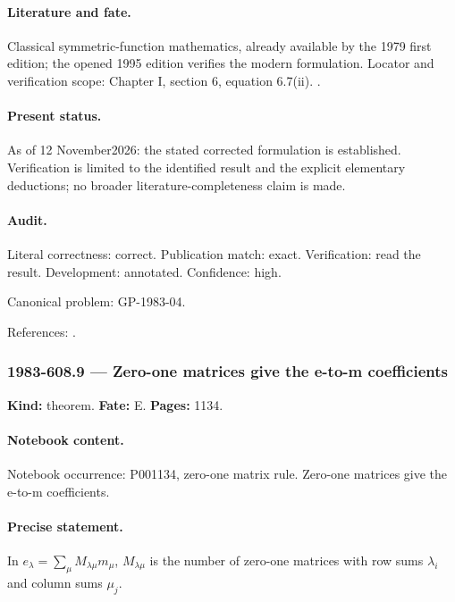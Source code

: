 \paragraph{Literature and fate.} Classical symmetric-function mathematics, already available by the 1979 first edition; the opened 1995 edition verifies the modern formulation. Locator and verification scope: Chapter I, section 6, equation 6.7(ii). \cite{macdonald1995symmetric}.

\paragraph{Present status.} As of 12 November2026: the stated corrected formulation is established. Verification is limited to the identified result and the explicit elementary deductions; no broader literature-completeness claim is made.

\paragraph{Audit.} Literal correctness: correct. Publication match: exact. Verification: read the result. Development: annotated. Confidence: high.

\noindent Canonical problem: GP-1983-04.\par

\noindent References: \citep{macdonald1995symmetric}.\par

\subsubsection{1983-608.9 --- Zero-one matrices give the e-to-m coefficients}

\label{item:1983-608.9}

\noindent\textbf{Kind:} theorem. \textbf{Fate:} E. \textbf{Pages:} 1134.\par

\paragraph{Notebook content.} Notebook occurrence: P001134, zero-one matrix rule. Zero-one matrices give the e-to-m coefficients.

\paragraph{Precise statement.} In \(e_\lambda=\sum_{\mu}M_{\lambda\mu}m_\mu\), \(M_{\lambda\mu}\) is the number of zero-one matrices with row sums \(\lambda_i\) and column sums \(\mu_j\).

